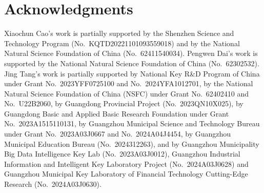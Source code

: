 \section*{Acknowledgments}
Xiaochun Cao's work is partially supported by the Shenzhen Science and Technology Program (No.\ KQTD20221101093559018) and by the National Natural Science Foundation of China (No.\ 62411540034). 
Pengwen Dai's work is supported by the National Natural Science Foundation of China (No.\ 62302532). 
Jing Tang's work is partially supported by National Key R\&D Program of China under Grant No.\ 2023YFF0725100 and No.\ 2024YFA1012701, by the National Natural Science Foundation of China (NSFC) under Grant No.\ 62402410 and No.\ U22B2060, by Guangdong Provincial Project (No.\ 2023QN10X025), by Guangdong Basic and Applied Basic Research Foundation under Grant No.\ 2023A1515110131, by Guangzhou Municipal Science and Technology Bureau under Grant No.\ 2023A03J0667 and No.\ 2024A04J4454, by Guangzhou Municipal Education Bureau (No.\ 2024312263), and by Guangzhou Municipality Big Data Intelligence Key Lab (No.\ 2023A03J0012), Guangzhou Industrial Information and Intelligent Key Laboratory Project (No.\ 2024A03J0628) and Guangzhou Municipal Key Laboratory of Financial Technology Cutting-Edge Research (No.\ 2024A03J0630).